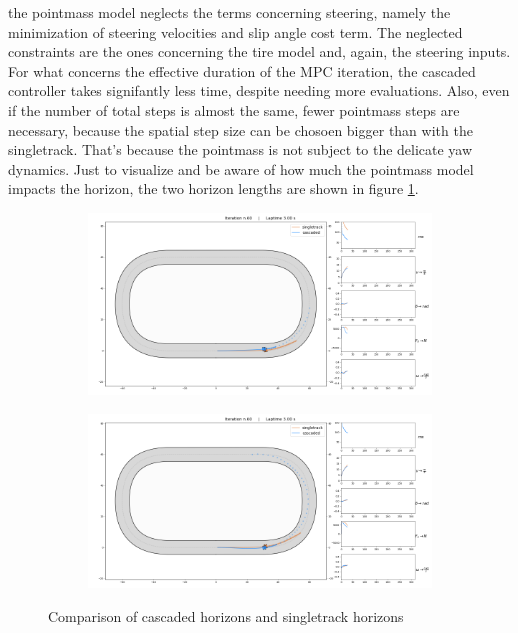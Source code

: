 \documentclass[a4paper, onecolumn, 12pt]{article}
\begin{document}
the pointmass model neglects the terms concerning steering, namely the
minimization of steering velocities and slip angle cost term. The neglected
constraints are the ones concerning the tire model and, again, the steering
inputs. For what concerns the effective duration of the MPC iteration, the
cascaded controller takes signifantly less time, despite needing more
evaluations. Also, even if the number of total steps is almost the same,
fewer pointmass steps are necessary, because the spatial step size can be
chosoen bigger than with the singletrack. That's because the pointmass is not
subject to the delicate yaw dynamics. Just to visualize and be aware of how much
the pointmass model impacts the horizon, the two horizon lengths are shown in
figure \ref{horizons}.
\begin{figure}[H] 
    \centering
        \begin{subfigure}{0.85\textwidth} 
        \centering
        \includegraphics[width=\textwidth]{assets/im/fig2_50.png}
    \end{subfigure}
    \begin{subfigure}{0.85\textwidth}
        \centering
        \includegraphics[width=\textwidth]{assets/im/fig2_60.png}
    \end{subfigure}
    \caption[short]{Comparison of cascaded horizons and singletrack horizons}
    \label{horizons}
\end{figure}
\end{document}
